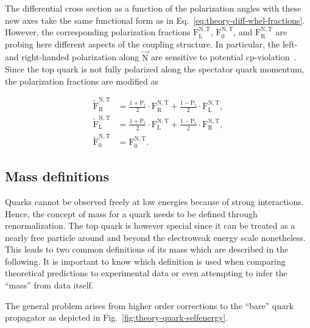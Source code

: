 The differential cross section as a function of the polarization angles with these new axes take the same functional form as in Eq.~\ref{eq:theory-diff-whel-fractions}. However, the corresponding polarization fractions $\mathrm{F}_\mathrm{L}^\mathrm{N,T}$, $\mathrm{F}_\mathrm{0}^\mathrm{N,T}$, and $\mathrm{F}_\mathrm{R}^\mathrm{N,T}$ are probing here different aspects of the coupling structure. In particular, the left- and right-handed polarization along $\vec{\mathrm{N}}$ are sensitive to potential \gls{cp}-violation~\cite{AguilarSaavedra:2010nx}. Since the top quark is not fully polarized along the spectator quark momentum, the  polarization fractions are modified as

\begin{align}
\tilde{\mathrm{F}}_\mathrm{R}^\mathrm{N,T}&=\frac{1+\mathrm{P}_\mathrm{t}}{2}\cdot\mathrm{F}_\mathrm{R}^\mathrm{N,T}+\frac{1-\mathrm{P}_\mathrm{t}}{2}\cdot\mathrm{F}_\mathrm{L}^\mathrm{N,T}, \\
\tilde{\mathrm{F}}_\mathrm{L}^\mathrm{N,T}&=\frac{1+\mathrm{P}_\mathrm{t}}{2}\cdot\mathrm{F}_\mathrm{L}^\mathrm{N,T}+\frac{1-\mathrm{P}_\mathrm{t}}{2}\cdot\mathrm{F}_\mathrm{R}^\mathrm{N,T}, \\
\tilde{\mathrm{F}}_\mathrm{0}^\mathrm{N,T}&=\mathrm{F}_\mathrm{0}^\mathrm{N,T}.
\end{align}



\subsection{Mass definitions}

Quarks cannot be observed freely at low energies because of strong interactions. Hence, the concept of mass for a quark needs to be defined through renormalization. The top quark is however special since it can be treated as a nearly free particle around and beyond the electroweak energy scale nonetheless. This leads to two common definitions of its mass which are described in the following. It is important to know which definition is used when comparing theoretical predictions to experimental data or even attempting to infer the ``mass'' from data itself.

The general problem arises from higher order corrections to the ``bare'' quark propagator as depicted in Fig.~\ref{fig:theory-quark-selfenergy}. 

